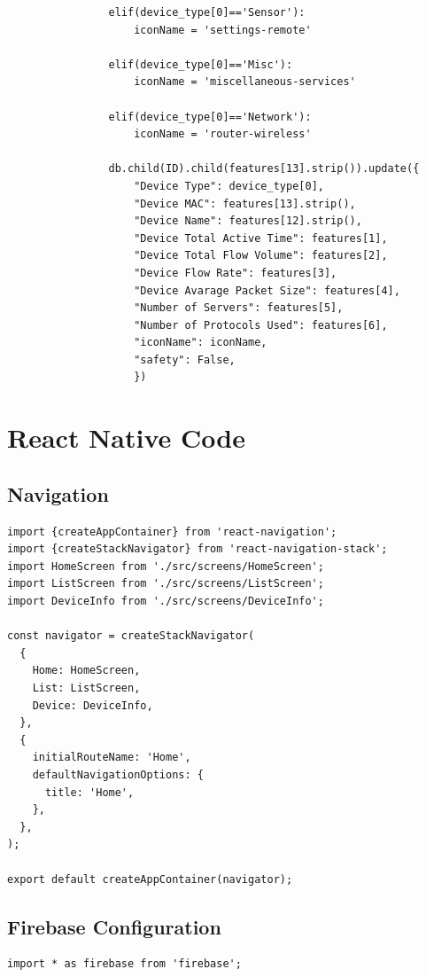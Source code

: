 \documentclass{article}
\begin{document}
\begin{appendices}
\begin{verbatim}
                elif(device_type[0]=='Sensor'):
                    iconName = 'settings-remote'
                   
                elif(device_type[0]=='Misc'):
                    iconName = 'miscellaneous-services'
                    
                elif(device_type[0]=='Network'):
                    iconName = 'router-wireless'
                   
                db.child(ID).child(features[13].strip()).update({
                    "Device Type": device_type[0],
                    "Device MAC": features[13].strip(),
                    "Device Name": features[12].strip(),
                    "Device Total Active Time": features[1],
                    "Device Total Flow Volume": features[2],
                    "Device Flow Rate": features[3],
                    "Device Avarage Packet Size": features[4],
                    "Number of Servers": features[5],
                    "Number of Protocols Used": features[6],
                    "iconName": iconName,
                    "safety": False,
                    })

\end{verbatim}

\section{React Native Code}
\subsection{Navigation}
\begin{verbatim}
import {createAppContainer} from 'react-navigation';
import {createStackNavigator} from 'react-navigation-stack';
import HomeScreen from './src/screens/HomeScreen';
import ListScreen from './src/screens/ListScreen';
import DeviceInfo from './src/screens/DeviceInfo';

const navigator = createStackNavigator(
  {
    Home: HomeScreen,
    List: ListScreen,
    Device: DeviceInfo,
  },
  {
    initialRouteName: 'Home',
    defaultNavigationOptions: {
      title: 'Home',
    },
  },
);

export default createAppContainer(navigator);
\end{verbatim}

\subsection{Firebase Configuration}
\begin{verbatim}
import * as firebase from 'firebase';


\end{verbatim}
\end{appendices}
\end{document}
